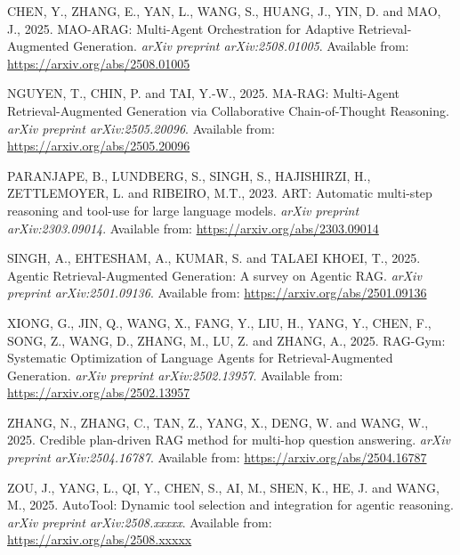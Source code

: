 \documentclass[12pt,a4paper]{article}
\begin{document}
\setlength{\parindent}{0pt}
\setlength{\parskip}{0.8em}

\justifying
\sloppy

CHEN, Y., ZHANG, E., YAN, L., WANG, S., HUANG, J., YIN, D. and MAO, J., 2025. 
MAO-ARAG: Multi-Agent Orchestration for Adaptive Retrieval-Augmented Generation. 
\textit{arXiv preprint arXiv:2508.01005}. 
Available from: 
\url{https://arxiv.org/abs/2508.01005}

NGUYEN, T., CHIN, P. and TAI, Y.-W., 2025. 
MA-RAG: Multi-Agent Retrieval-Augmented Generation via Collaborative Chain-of-Thought Reasoning. 
\textit{arXiv preprint arXiv:2505.20096}. 
Available from: 
\url{https://arxiv.org/abs/2505.20096}

PARANJAPE, B., LUNDBERG, S., SINGH, S., HAJISHIRZI, H., ZETTLEMOYER, L. and RIBEIRO, M.T., 2023. 
ART: Automatic multi-step reasoning and tool-use for large language models. 
\textit{arXiv preprint arXiv:2303.09014}. 
Available from: 
\url{https://arxiv.org/abs/2303.09014}

SINGH, A., EHTESHAM, A., KUMAR, S. and TALAEI KHOEI, T., 2025. 
Agentic Retrieval-Augmented Generation: A survey on Agentic RAG. 
\textit{arXiv preprint arXiv:2501.09136}. 
Available from: 
\url{https://arxiv.org/abs/2501.09136}

XIONG, G., JIN, Q., WANG, X., FANG, Y., LIU, H., YANG, Y., CHEN, F., SONG, Z., WANG, D., ZHANG, M., LU, Z. and ZHANG, A., 2025. 
RAG-Gym: Systematic Optimization of Language Agents for Retrieval-Augmented Generation. 
\textit{arXiv preprint arXiv:2502.13957}. 
Available from: 
\url{https://arxiv.org/abs/2502.13957}

ZHANG, N., ZHANG, C., TAN, Z., YANG, X., DENG, W. and WANG, W., 2025. 
Credible plan-driven RAG method for multi-hop question answering. 
\textit{arXiv preprint arXiv:2504.16787}. 
Available from: 
\url{https://arxiv.org/abs/2504.16787}

ZOU, J., YANG, L., QI, Y., CHEN, S., AI, M., SHEN, K., HE, J. and WANG, M., 2025. 
AutoTool: Dynamic tool selection and integration for agentic reasoning. 
\textit{arXiv preprint arXiv:2508.xxxxx}. 
Available from: 
\url{https://arxiv.org/abs/2508.xxxxx}


\appendix
\end{document}
